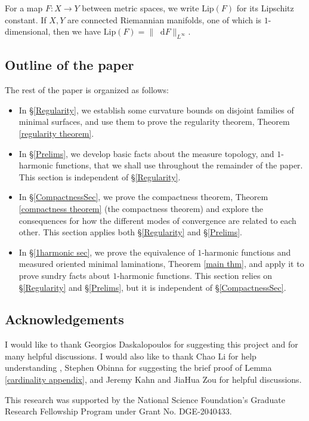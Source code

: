 \documentclass[reqno,11pt]{amsart}
\newcommand*\dif{\mathop{}\!\mathrm{d}}
\newcommand{\Lip}{\mathrm{Lip}}
\theoremstyle{definition}
\numberwithin{equation}{section}
\begin{document}
For a map $F: X \to Y$ between metric spaces, we write $\Lip(F)$ for its Lipschitz constant.
If $X, Y$ are connected Riemannian manifolds, one of which is $1$-dimensional, then we have $\Lip(F) = \|\dif F\|_{L^\infty}$.

\subsection{Outline of the paper}
The rest of the paper is organized as follows:
\begin{itemize}
\item In \S\ref{Regularity}, we establish some curvature bounds on disjoint families of minimal surfaces, and use them to prove the regularity theorem, Theorem \ref{regularity theorem}.
\item In \S\ref{Prelims}, we develop basic facts about the measure topology, and $1$-harmonic functions, that we shall use throughout the remainder of the paper. This section is independent of \S\ref{Regularity}.
\item In \S\ref{CompactnessSec}, we prove the compactness theorem, Theorem \ref{compactness theorem} (the compactness theorem) and explore the consequences for how the different modes of convergence are related to each other. This section applies both \S\ref{Regularity} and \S\ref{Prelims}.
\item In \S\ref{1harmonic sec}, we prove the equivalence of $1$-harmonic functions and measured oriented minimal laminations, Theorem \ref{main thm}, and apply it to prove sundry facts about $1$-harmonic functions. This section relies on \S\ref{Regularity} and \S\ref{Prelims}, but it is independent of \S\ref{CompactnessSec}.
\end{itemize}


\subsection{Acknowledgements}
I would like to thank Georgios Daskalopoulos for suggesting this project and for many helpful discussions.
I would also like to thank Chao Li for help understanding \cite{Chodosh2021}, Stephen Obinna for suggesting the brief proof of Lemma \ref{cardinality appendix}, and Jeremy Kahn and JiaHua Zou for helpful discussions.

This research was supported by the National Science Foundation's Graduate Research Fellowship Program under Grant No. DGE-2040433.
\end{document}
